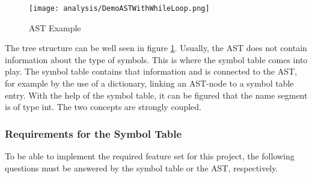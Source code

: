 \begin{figure}[H]
    \centering
    \texttt{[image: analysis/DemoASTWithWhileLoop.png]}
    \caption{AST Example}
    \label{fig:ast_for_example}
\end{figure}

The tree structure can be well seen in figure \ref{fig:ast_for_example}.
Usually, the AST does not contain information about the type of symbols.
This is where the symbol table comes into play.
The symbol table contains that information and is connected to the AST, for example by the use of a dictionary, linking an AST-node to a symbol table entry.
With the help of the symbol table, it can be figured that the name segment  is of type int.
The two concepts are strongly coupled.

\subsubsection{Requirements for the Symbol Table}
To be able to implement the required feature set for this project, the following questions must be answered by the symbol table or the AST, respectively.

